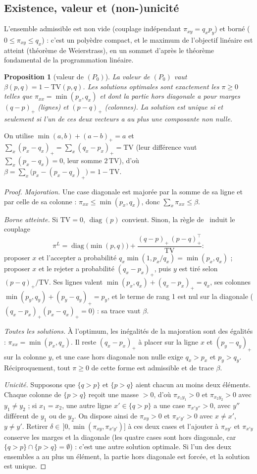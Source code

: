 \documentclass[11pt,a4paper]{article}
\newcommand{\TV}{\mathrm{TV}}
\newcommand{\diag}{\operatorname{diag}}
\theoremstyle{plain}
\newtheorem{proposition}{Proposition}
\begin{document}
\subsection{Existence, valeur et (non-)unicité}\label{sec:existenceI}
L'ensemble admissible est non vide (couplage indépendant $\pi_{xy}=q_xp_y$) et borné ($0\le\pi_{xy}\le q_x$) : c'est un polyèdre compact, et le maximum de l'objectif linéaire est atteint (théorème de Weierstrass), en un sommet d'après le théorème fondamental de la programmation linéaire.

\begin{proposition}[valeur de $(P_0)$]\label{prop:valeur}
La valeur de $(P_0)$ vaut $\beta(p,q)=1-\TV(p,q)$. Les solutions optimales sont exactement les $\pi\ge0$ telles que $\pi_{xx}=\min(p_x,q_x)$ et dont la partie hors diagonale a pour marges $(q-p)_+$ (lignes) et $(p-q)_+$ (colonnes). La solution est unique si et seulement si l'un de ces deux vecteurs a au plus une composante non nulle.
\end{proposition}
On utilise $\min(a,b)+(a-b)_+=a$ et $\sum_x(p_x-q_x)_+=\sum_x(q_x-p_x)_+=\TV$ (leur différence vaut $\sum_x(p_x-q_x)=0$, leur somme $2\,\TV$), d'où $\beta=\sum_x\big(p_x-(p_x-q_x)_+\big)=1-\TV$.
\begin{proof}
\emph{Majoration.} Une case diagonale est majorée par la somme de sa ligne et par celle de sa colonne : $\pi_{xx}\le\min(p_x,q_x)$, donc $\sum_x\pi_{xx}\le\beta$.

\emph{Borne atteinte.} Si $\TV=0$, $\diag(p)$ convient. Sinon, la règle de~\cite{leviathan} induit le couplage
\[\pi^L=\diag\big(\min(p,q)\big)+\frac{(q-p)_+\,(p-q)_+^{\top}}{\TV}:\]
proposer $x$ et l'accepter a probabilité $q_x\min(1,p_x/q_x)=\min(p_x,q_x)$ ; proposer $x$ et le rejeter a probabilité $(q_x-p_x)_+$, puis $y$ est tiré selon $(p-q)_+/\TV$. Ses lignes valent $\min(p_x,q_x)+(q_x-p_x)_+=q_x$, ses colonnes $\min(p_y,q_y)+(p_y-q_y)_+=p_y$, et le terme de rang 1 est nul sur la diagonale ($(q_x-p_x)_+(p_x-q_x)_+=0$) : sa trace vaut $\beta$.

\emph{Toutes les solutions.} À l'optimum, les inégalités de la majoration sont des égalités : $\pi_{xx}=\min(p_x,q_x)$. Il reste $(q_x-p_x)_+$ à placer sur la ligne $x$ et $(p_y-q_y)_+$ sur la colonne $y$, et une case hors diagonale non nulle exige $q_x>p_x$ et $p_y>q_y$. Réciproquement, tout $\pi\ge0$ de cette forme est admissible et de trace $\beta$.

\emph{Unicité.} Supposons que $\{q>p\}$ et $\{p>q\}$ aient chacun au moins deux éléments. Chaque colonne de $\{p>q\}$ reçoit une masse $>0$, d'où $\pi_{x_1y_1}>0$ et $\pi_{x_2y_2}>0$ avec $y_1\ne y_2$ ; si $x_1=x_2$, une autre ligne $x'\in\{q>p\}$ a une case $\pi_{x'y''}>0$, avec $y''$ différent de $y_1$ ou de $y_2$. On dispose ainsi de $\pi_{xy}>0$ et $\pi_{x'y'}>0$ avec $x\ne x'$, $y\ne y'$. Retirer $\delta\in\,]0,\min(\pi_{xy},\pi_{x'y'})]$ à ces deux cases et l'ajouter à $\pi_{xy'}$ et $\pi_{x'y}$ conserve les marges et la diagonale (les quatre cases sont hors diagonale, car $\{q>p\}\cap\{p>q\}=\emptyset$) : c'est une autre solution optimale. Si l'un des deux ensembles a au plus un élément, la partie hors diagonale est forcée, et la solution est unique.
\end{proof}
\end{document}
